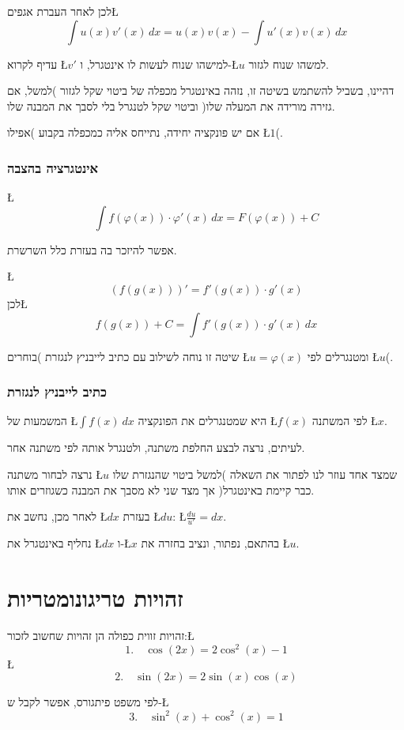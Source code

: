 \documentclass[english,hebrew]{article}
\begin{document}
לכן לאחר העברת אגפים\L{%
\[
\int u(x)v'(x)\,dx=u(x)v(x)-\int u'(x)v(x)\,dx
\]
}%

עדיף לקרוא \L{$v'$} למישהו שנוח לעשות לו אינטגרל, ו-\L{$u$} למשהו
שנוח לגזור. 

דהיינו, בשביל להשתמש בשיטה זו, נזהה באינטגרל מכפלה של ביטוי שקל לגזור
)למשל, אם גזירה מורידה את המעלה שלו( וביטוי שקל לטנגרל בלי לסבך את
המבנה שלו.

אם יש פונקציה יחידה, נתייחס אליה כמכפלה בקבוע )אפילו \L{$1$}(.

\section{אינטגרציה בהצבה}

\L{%
\[
\int f(\varphi(x))\cdot\varphi'(x)\,dx=F(\varphi(x))+C
\]
}%

אפשר להיזכר בה בעזרת כלל השרשרת.

\L{%
\[
\left(f(g(x))\right)'=f'(g(x))\cdot g'(x)
\]
}%
לכן\L{%
\[
f(g(x))+C=\int f'(g(x))\cdot g'(x)\ dx
\]
}%

שיטה זו נוחה לשילוב עם כתיב לייבניץ לנגזרת )בוחרים \L{$u=\varphi(x)$}
ומטנגרלים לפי \L{$u$}(. 

\section{כתיב לייבניץ לנגזרת}

המשמעות של \L{$\int f(x)\ dx$} היא שמטנגרלים את הפונקציה \L{$f(x)$}
לפי המשתנה \L{$x$}.

לעיתים, נרצה לבצע החלפת משתנה, ולטנגרל אותה לפי משתנה אחר.

נרצה לבחור משתנה \L{$u$} שמצד אחד עוזר לנו לפתור את השאלה )למשל ביטוי
שהנגזרת שלו כבר קיימת באינטגרל( אך מצד שני לא מסבך את המבנה כשגוזרים
אותו.

לאחר מכן, נחשב את \L{$dx$} בעזרת \L{$du$}: \L{$\frac{du}{u'}=dx$}. 

נחליף באינטגרל את \L{$dx$} ו-\L{$x$} בהתאם, נפתור, ונציב בחזרה את
\L{$u$}.

\newpage{}

\part{זהויות טריגונומטריות}

זהויות זווית כפולה הן זהויות שחשוב לזכור:\L{%
\[
1.\quad\cos\left(2x\right)=2\cos^{2}(x)-1
\]
}%
\L{%
\[
2.\quad\sin(2x)=2\sin(x)\cos(x)
\]
}%

לפי משפט פיתגורס, אפשר לקבל ש-\L{%
\[
3.\quad\sin^{2}(x)+\cos^{2}(x)=1
\]
}%
\end{document}

